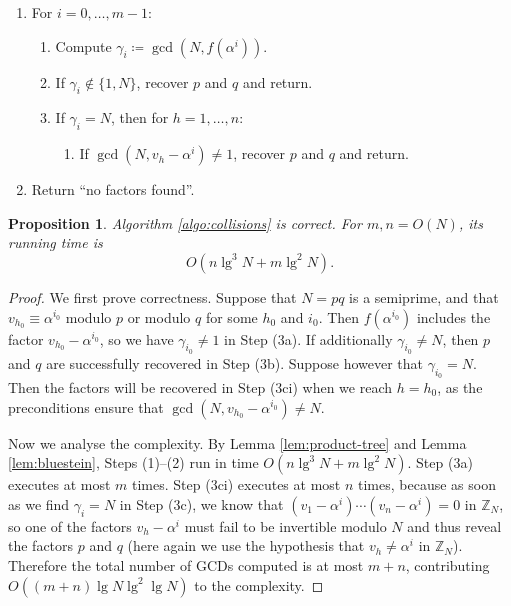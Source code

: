 \documentclass[reqno]{amsart}
\newtheorem{prop}[thm]{Proposition}
\theoremstyle{remark}
\numberwithin{equation}{section}
\numberwithin{thm}{section}
\newcommand{\ZZ}{\mathbb{Z}}
\newcommand{\defeq}{\coloneqq}
\begin{document}
\begin{myalgorithm}[ht]
\begin{enumerate}[label=\arabic*),labelwidth=0.7cm,leftmargin=\labelwidth,itemsep=0.2em,topsep=\itemsep]
      compute the values $f(\alpha^i) \in \ZZ_N$ for $i = 0, \ldots, m-1$.
    \item For $i = 0, \ldots, m-1$:
    \begin{enumerate}[label=\alph*),itemsep=0.2em,topsep=\itemsep]
      \item Compute $\gamma_i \defeq \gcd(N, f(\alpha^i))$.
      \item If $\gamma_i \notin \{1, N\}$, recover $p$ and $q$ and return.
      \item If $\gamma_i = N$, then for $h = 1, \ldots, n$:
	\begin{enumerate}[label=\roman*),itemsep=0.2em,topsep=\itemsep]
	  \item If $\gcd(N, v_h - \alpha^i) \neq 1$,
	  recover $p$ and $q$ and return.
	\end{enumerate}
    \end{enumerate}
    \item Return ``no factors found''.
  \end{enumerate}
\end{myalgorithm}

\begin{prop}
\label{prop:collisions}
  Algorithm \ref{algo:collisions} is correct.
  For $m, n = O(N)$, its running time is
    \[ O(n \lg^3 N + m \lg^2 N). \]
\end{prop}
\begin{proof}
  We first prove correctness.
  Suppose that $N = pq$ is a semiprime, and that $v_{h_0} \equiv \alpha^{i_0}$
  modulo $p$ or modulo $q$ for some $h_0$ and $i_0$.
  Then $f(\alpha^{i_0})$ includes the factor $v_{h_0} - \alpha^{i_0}$,
  so we have $\gamma_{i_0} \neq 1$ in Step (3a).
  If additionally $\gamma_{i_0} \neq N$,
  then $p$ and $q$ are successfully recovered in Step (3b).
  Suppose however that $\gamma_{i_0} = N$.
  Then the factors will be recovered in Step (3ci) when we reach $h = h_0$,
  as the preconditions ensure that $\gcd(N, v_{h_0} - \alpha^{i_0}) \neq N$.

  Now we analyse the complexity.
  By Lemma \ref{lem:product-tree} and Lemma \ref{lem:bluestein},
  Steps (1)--(2) run in time $O(n \lg^3 N + m \lg^2 N)$.
  Step (3a) executes at most $m$ times.
  Step (3ci) executes at most $n$ times,
  because as soon as we find $\gamma_i = N$ in Step (3c),
  we know that $(v_1 - \alpha^i) \cdots (v_n - \alpha^i) = 0$ in $\ZZ_N$,
  so one of the factors $v_h - \alpha^i$ must fail to be invertible modulo $N$
  and thus reveal the factors $p$ and $q$
  (here again we use the hypothesis that $v_h \neq \alpha^i$ in $\ZZ_N$).
  Therefore the total number of GCDs computed is at most $m + n$,
  contributing $O((m + n) \lg N \lg^2 \lg N)$ to the complexity.
\end{proof}
\end{document}
